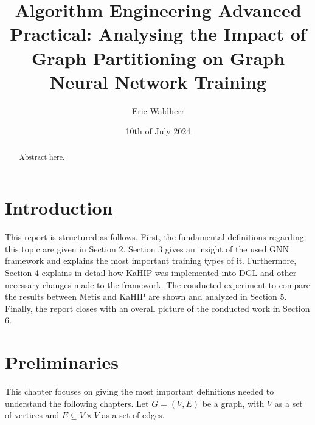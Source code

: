 \documentclass[acmsmall,nonacm,screen,review]{acmart}
\title{Algorithm Engineering Advanced Practical: Analysing the Impact of Graph Partitioning on Graph Neural Network Training}
\author{Eric Waldherr}
\affiliation{%
  \institution{Heidelberg University}
  \streetaddress{Im Neuenheimer Feld 205}
  \city{Heidelberg}
  \state{Baden-Württemberg}
  \country{Germany}
  \postcode{69120}
}
\date{10th of July 2024}
\begin{document}
\begin{abstract}
Abstract here.
\end{abstract}
\maketitle

\section{Introduction}
This report is structured as follows. First, the fundamental definitions regarding this topic are given in Section 2. Section 3 gives an insight of the used GNN framework and explains the most important training types of it. Furthermore, Section 4 explains in detail how KaHIP was implemented into DGL and other necessary changes made to the framework. The conducted experiment to compare the results between Metis and KaHIP are shown and analyzed in Section 5. Finally, the report closes with an overall picture of the conducted work in Section 6. 
\section{Preliminaries}
This chapter focuses on giving the most important definitions needed to understand the following chapters. Let $G=(V,E)$ be a graph, with $V$ as a set of vertices and $E \subseteq V \times V$ as a set of edges.
\end{document}
